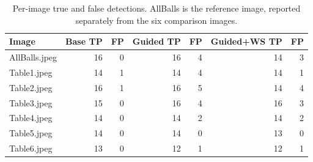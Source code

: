 \begin{table}[htbp]
\centering
\small
\caption{Per-image true and false detections. AllBalls is the reference image, reported separately from the six comparison images.}
\label{tab:segmentation-hough-images}
\begin{tabular}{lrrrrrr}
\toprule
Image & Base TP & FP & Guided TP & FP & Guided+WS TP & FP \\
\midrule
AllBalls.jpeg & 16 & 0 & 16 & 4 & 14 & 3 \\
Table1.jpeg & 14 & 1 & 14 & 4 & 14 & 1 \\
Table2.jpeg & 16 & 1 & 16 & 5 & 14 & 4 \\
Table3.jpeg & 15 & 0 & 16 & 4 & 16 & 3 \\
Table4.jpeg & 14 & 0 & 14 & 2 & 14 & 2 \\
Table5.jpeg & 14 & 0 & 14 & 0 & 13 & 0 \\
Table6.jpeg & 13 & 0 & 12 & 1 & 12 & 1 \\
\bottomrule
\end{tabular}
\end{table}
\FloatBarrier
